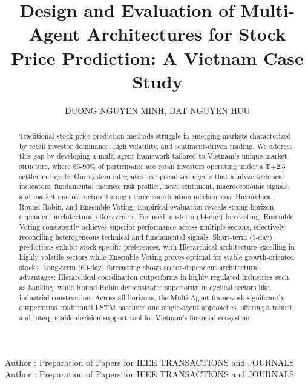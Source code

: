 \documentclass{ieeeaccess}
\begin{document}

\title{Design and Evaluation of Multi-Agent Architectures
for Stock Price Prediction: A Vietnam Case Study}
\author{
    \uppercase{Duong Nguyen Minh}, 
    \uppercase{Dat Nguyen Huu}
}

\address[1]{School of Computing, Phenikaa University, Vietnam\\
(e-mail: 23010441@st.phenikaa-uni.edu.vn)}

\address[2]{School of Computing, Phenikaa University, Vietnam\\
(e-mail: dat.nguyenhuu@phenikaa-uni.edu.vn)}



\markboth
{Author \headeretal: Preparation of Papers for IEEE TRANSACTIONS and JOURNALS}
{Author \headeretal: Preparation of Papers for IEEE TRANSACTIONS and JOURNALS}



\begin{abstract}
Traditional stock price prediction methods struggle in emerging markets characterized by retail investor dominance, high volatility, and sentiment-driven trading. We address this gap by developing a multi-agent framework tailored to Vietnam's unique market structure, where 85-90\% of participants are retail investors operating under a T+2.5 settlement cycle. Our system integrates six specialized agents that analyze technical indicators, fundamental metrics, risk profiles, news sentiment, macroeconomic signals, and market microstructure through three coordination mechanisms: Hierarchical, Round Robin, and Ensemble Voting. Empirical evaluation reveals strong horizon-dependent architectural effectiveness. For medium-term (14-day) forecasting, Ensemble Voting consistently achieves superior performance across multiple sectors, effectively reconciling heterogeneous technical and fundamental signals. Short-term (3-day) predictions exhibit stock-specific preferences, with Hierarchical architecture excelling in highly volatile sectors while Ensemble Voting proves optimal for stable growth-oriented stocks. Long-term (60-day) forecasting shows sector-dependent architectural advantages: Hierarchical coordination outperforms in highly regulated industries such as banking, while Round Robin demonstrates superiority in cyclical sectors like industrial construction. Across all horizons, the Multi-Agent framework significantly outperforms traditional LSTM baselines and single-agent approaches, offering a robust and interpretable decision-support tool for Vietnam's financial ecosystem.
\end{abstract}
\end{document}
